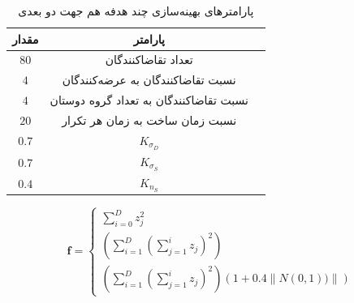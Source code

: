 \begin{table}[H]
		\caption{پارامترهای بهینه‌سازی چند هدفه هم جهت دو بعدی}
		\centering
		\begin{tabular}{|c|c|c|}
			\hline
			مقدار & پارامتر\\
			\hline
		$	80$ 
		& تعداد تقاضا‌کنندگان\\
			$4$ 
			& نسبت تقاضاکنندگان به عرضه‌کنندگان \\
	 	$	4 $
	 	& نسبت تقاضاکنندگان به تعداد گروه دوستان\\
	 	$20$ 
	 	& نسبت زمان ساخت به زمان هر تکرار \\
	 		$0.7 $ &$K_{\sigma_D}$ \\
	 		$0.7$ &$K_{\sigma_S}$ \\
	 		$0.4$ &$K_{n_S}$ \\
	 		
			\hline
		\end{tabular}
\end{table}

\begin{equation}
	\boldsymbol{f} = 
	\begin{cases}
		\sum_{i=0}^{D}z_j^2 \\
		\left(\sum_{i=1}^{D}\left(\sum_{j=1}^{i}z_j\right)^2\right) \\
		\left(\sum_{i=1}^{D}\left(\sum_{j=1}^{i}z_j\right)^2\right)(1+0.4\left\|N(0, 1))\right\|) 
	\end{cases}
\end{equation}

